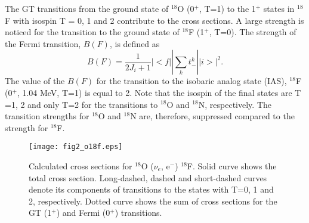 \documentclass[preprint,12pt]{elsarticle}
\begin{document}
The GT transitions from the ground state of $^{18}$O (0$^{+}$, T=1) to the 1$^{+}$ states in $^{18}$F with isospin T = 0, 1 and 2 contribute to the cross sections.
A large strength is noticed for the transition  
to the ground state of $^{18}$F (1$^{+}$, T=0). 
The strength of the Fermi transition, $B(F)$, is defined as
\begin{equation}
B(F) = \frac{1}{2J_i +1} |<f|| \sum_{k} t_{-}^{k} ||i>|^2.
\end{equation}
The value of the $B(F)$ for the transition to the isobaric analog state (IAS), $^{18}$F (0$^{+}$, 1.04 MeV, T=1) is equal to 2.
Note that the isospin of the final states are T =1, 2 and only T=2 for the transitions to $^{18}$O and $^{18}$N, respectively. 
The transition strengths for $^{18}$O and $^{18}$N are, therefore, suppressed compared to the strength for $^{18}$F.
  

\begin{figure}[htbp]
\begin{minipage}{0.45\hsize}
\begin{center}
\hspace*{1cm}
\texttt{[image: fig2\_o18f.eps]}
\end{center}
\end{minipage}
\vspace*{-3.5cm}
\caption{
\small 
Calculated cross sections for $^{18}$O ($\nu_e$, e$^{-}$) $^{18}$F. Solid curve shows the total cross section. 
Long-dashed, dashed and short-dashed curves denote its components of transitions to the states with T=0, 1 and 2, respectively.
Dotted curve shows the sum of cross sections for the GT (1$^{+}$) and Fermi (0$^{+}$) transitions.} 
\label{crosf18}
\end{figure}
\end{document}

